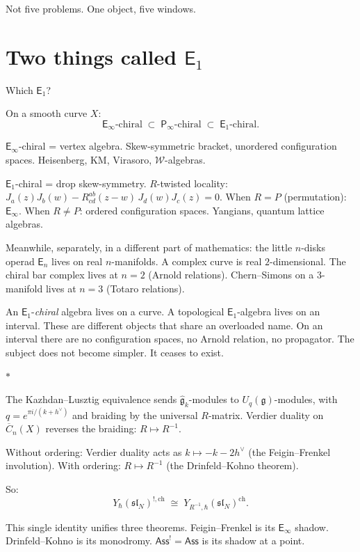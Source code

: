 \documentclass[11pt]{article}
\newcommand{\cW}{\mathcal{W}}
\newcommand{\fg}{\mathfrak{g}}
\newcommand{\fsl}{\mathfrak{sl}}
\newcommand{\Ass}{\mathsf{Ass}}
\newcommand{\Eone}{\mathsf{E}_1}
\newcommand{\Einf}{\mathsf{E}_{\infty}}
\newcommand{\Pinf}{\mathsf{P}_{\infty}}
\newcommand{\sep}{\bigskip\begin{center}$*$\end{center}\medskip}
\begin{document}
Not five problems.  One object, five windows.


\section{Two things called $\Eone$}
\label{sec:two-e1}

Which $\Eone$?

On a smooth curve $X$:
\[
\Einf\text{-chiral}
\;\subset\; \Pinf\text{-chiral}
\;\subset\; \Eone\text{-chiral}.
\]

$\Einf$-chiral = vertex algebra.  Skew-symmetric bracket,
unordered configuration spaces.  Heisenberg, KM, Virasoro,
$\cW$-algebras.

$\Eone$-chiral = drop skew-symmetry.  $R$-twisted locality:
$J_a(z) J_b(w) - R^{ab}_{cd}(z{-}w)\, J_d(w) J_c(z) = 0$.
When $R = P$ (permutation): $\Einf$.  When $R \neq P$: ordered
configuration spaces.  Yangians, quantum lattice algebras.

Meanwhile, separately, in a different part of mathematics: the
little $n$-disks operad $\mathsf{E}_n$ lives on real
$n$-manifolds.  A complex curve is real $2$-dimensional.  The
chiral bar complex lives at $n = 2$ (Arnold relations).
Chern--Simons on a $3$-manifold lives at $n = 3$ (Totaro
relations).

An $\Eone$-\emph{chiral} algebra lives on a curve.  A topological
$\Eone$-algebra lives on an interval.  These are different objects
that share an overloaded name.  On an interval there are no
configuration spaces, no Arnold relation, no propagator.  The
subject does not become simpler.  It ceases to exist.

\sep

The Kazhdan--Lusztig equivalence sends $\widehat{\fg}_k$-modules
to $U_q(\fg)$-modules, with $q = e^{\pi i/(k+h^\vee)}$ and
braiding by the universal $R$-matrix.  Verdier duality on
$\overline{C}_n(X)$ reverses the braiding: $R \mapsto R^{-1}$.

Without ordering: Verdier duality acts as
$k \mapsto -k - 2h^\vee$ (the Feigin--Frenkel involution).  With
ordering: $R \mapsto R^{-1}$ (the Drinfeld--Kohno theorem).

So:
\[
Y_\hbar(\fsl_N)^{!,\mathrm{ch}}
\;\cong\;
Y_{R^{-1},\hbar}(\fsl_N)^{\mathrm{ch}}.
\]

This single identity unifies three theorems.  Feigin--Frenkel is
its $\Einf$ shadow.  Drinfeld--Kohno is its monodromy.
$\Ass^! = \Ass$ is its shadow at a point.
\end{document}
